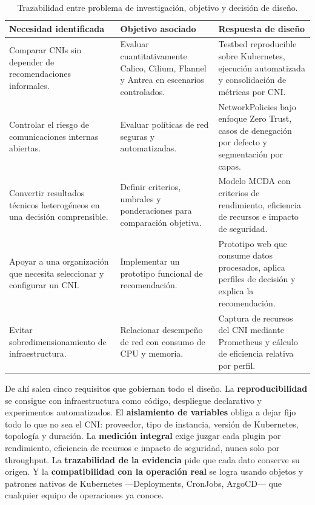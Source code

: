 \begin{table}[htbp]
\centering
\scriptsize
\caption{Trazabilidad entre problema de investigación, objetivo y decisión de diseño.}
\label{tab:trazabilidad-diseno}
\begin{tabularx}{\textwidth}{|Y|Y|Y|}
\hline
\textbf{Necesidad identificada} & \textbf{Objetivo asociado} & \textbf{Respuesta de diseño} \\
\hline
Comparar CNIs sin depender de recomendaciones informales. & Evaluar cuantitativamente Calico, Cilium, Flannel y Antrea en escenarios controlados. & Testbed reproducible sobre Kubernetes, ejecución automatizada y consolidación de métricas por CNI. \\
\hline
Controlar el riesgo de comunicaciones internas abiertas. & Evaluar políticas de red seguras y automatizadas. & NetworkPolicies bajo enfoque Zero Trust, casos de denegación por defecto y segmentación por capas. \\
\hline
Convertir resultados técnicos heterogéneos en una decisión comprensible. & Definir criterios, umbrales y ponderaciones para comparación objetiva. & Modelo MCDA con criterios de rendimiento, eficiencia de recursos e impacto de seguridad. \\
\hline
Apoyar a una organización que necesita seleccionar y configurar un CNI. & Implementar un prototipo funcional de recomendación. & Prototipo web que consume datos procesados, aplica perfiles de decisión y explica la recomendación. \\
\hline
Evitar sobredimensionamiento de infraestructura. & Relacionar desempeño de red con consumo de CPU y memoria. & Captura de recursos del CNI mediante Prometheus y cálculo de eficiencia relativa por perfil. \\
\hline
\end{tabularx}
\end{table}

De ahí salen cinco requisitos que gobiernan todo el diseño. La \textbf{reproducibilidad} se consigue con infraestructura como código, despliegue declarativo y experimentos automatizados. El \textbf{aislamiento de variables} obliga a dejar fijo todo lo que no sea el CNI: proveedor, tipo de instancia, versión de Kubernetes, topología y duración. La \textbf{medición integral} exige juzgar cada plugin por rendimiento, eficiencia de recursos e impacto de seguridad, nunca solo por throughput. La \textbf{trazabilidad de la evidencia} pide que cada dato conserve su origen. Y la \textbf{compatibilidad con la operación real} se logra usando objetos y patrones nativos de Kubernetes ---Deployments, CronJobs, ArgoCD--- que cualquier equipo de operaciones ya conoce.

